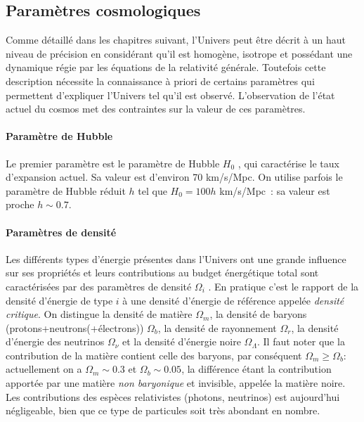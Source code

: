 \subsection{Paramètres cosmologiques}
Comme détaillé dans les chapitres suivant, l'Univers peut être décrit à un haut niveau de précision en considérant qu'il est homogène, isotrope et possédant une dynamique régie par les équations de la relativité générale. Toutefois cette description nécessite la connaissance à priori de certains paramètres qui permettent d'expliquer l'Univers tel qu'il est observé. L'observation de l'état actuel du cosmos met des contraintes sur la valeur de ces paramètres.

\paragraph{Paramètre de Hubble} Le premier paramètre est le paramètre de Hubble $H_0$ , qui caractérise le taux d'expansion actuel. Sa valeur est d'environ 70 km/s/Mpc. On utilise parfois le paramètre de Hubble réduit $h$ tel que $H_0=100 h$ km/s/Mpc~: sa valeur est proche $h\sim 0.7$.

\paragraph{Paramètres de densité} Les différents types d'énergie présentes dans l'Univers ont une grande influence sur ses propriétés et leurs contributions au budget énergétique total sont caractérisées par des paramètres de densité $\Omega_i$ . En pratique c'est le rapport de la densité d'énergie de type $i$ à une densité d'énergie de référence appelée \textit{densité critique}. On distingue la densité de matière $\Omega_m$, la densité de baryons (protons+neutrons(+électrons)) $\Omega_b$, la densité de rayonnement $\Omega_r$, la densité d'énergie des neutrinos $\Omega_\nu$ et la densité d'énergie noire $\Omega_\Lambda$. Il faut noter que la contribution de la matière contient celle des baryons, par conséquent $\Omega_m\ge\Omega_b$: actuellement on a $\Omega_m\sim 0.3$ et $\Omega_b\sim 0.05$, la différence étant la contribution apportée par une matière \textit{non baryonique} et invisible, appelée la matière noire. Les contributions des espèces relativistes (photons, neutrinos) est aujourd'hui négligeable, bien que ce type de particules soit très abondant en nombre.

